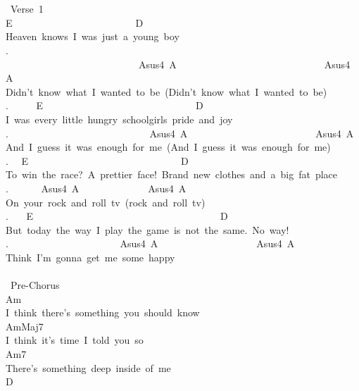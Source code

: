 {\\
\\
\lbrack\ Verse\ 1\rbrack\\
E\ \ \ \ \ \ \ \ \ \ \ \ \ \ \ \ \ \ \ \ \ \ \ \ \ D\\
Heaven\ knows\ I\ was\ just\ a\ young\ boy\\
. \ \ \ \ \ \ \ \ \ \ \ \ \ \ \ \ \ \ \ \ \ \ \ \ \ \ \ Asus4\ A\ \ \ \ \ \ \ \ \ \ \ \ \ \ \ \ \ \ \ \ \ \ \ \ \ \ \ \ \ \ Asus4\ A\\
Didn't\ know\ what\ I\ wanted\ to\ be\ (Didn't\ know\ what\ I\ wanted\ to\ be)\\
. \ \ \ \ \ E\ \ \ \ \ \ \ \ \ \ \ \ \ \ \ \ \ \ \ \ \ \ \ \ \ \ \ \ \ \ \ D\\
I\ was\ every\ little\ hungry\ schoolgirls\ pride\ and\ joy\\
. \ \ \ \ \ \ \ \ \ \ \ \ \ \ \ \ \ \ \ \ \ \ \ \ \ \ \ \ Asus4\ A\ \ \ \ \ \ \ \ \ \ \ \ \ \ \ \ \ \ \ \ \ \ \ \ \ \ Asus4\ A\\
And\ I\ guess\ it\ was\ enough\ for\ me\ (And\ I\ guess\ it\ was\ enough\ for\ me)\\
. \ \ E\ \ \ \ \ \ \ \ \ \ \ \ \ \ \ \ \ \ \ \ \ \ \ \ \ \ \ \ \ \ \ D\\
To\ win\ the\ race?\ A\ prettier\ face!\ Brand\ new\ clothes\ and\ a\ big\ fat\ place\\
. \ \ \ \ \ \ Asus4\ A\ \ \ \ \ \ \ \ \ \ \ \ \ \ Asus4\ A\\
On\ your\ rock\ and\ roll\ tv\ (rock\ and\ roll\ tv)\\
. \ \ \ E\ \ \ \ \ \ \ \ \ \ \ \ \ \ \ \ \ \ \ \ \ \ \ \ \ \ \ \ \ \ \ \ \ \ \ \ \ \ D\\
But\ today\ the\ way\ I\ play\ the\ game\ is\ not\ the\ same.\ No\ way!\\
. \ \ \ \ \ \ \ \ \ \ \ \ \ \ \ \ \ \ \ \ \ \ Asus4\ A\ \ \ \ \ \ \ \ \ \ \ \ \ \ \ \ \ \ \ \ Asus4\ A\\
Think\ I'm\ gonna\ get\ me\ some\ happy\\
\\
\lbrack\ Pre-Chorus\rbrack\\
Am\ \\
I\ think\ there's\ something\ you\ should\ know\\
AmMaj7\\
I\ think\ it's\ time\ I\ told\ you\ so\\
Am7\\
There's\ something\ deep\ inside\ of\ me\\
D\\
}
